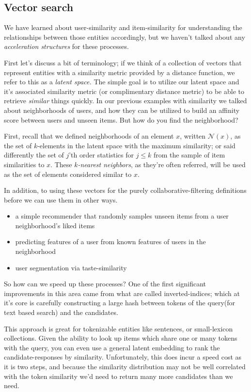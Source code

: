 \subsection{Vector search}

We have learned about user-similarity and item-similarity for understanding the relationships between those entities accordingly, but we haven't talked about any \emph{acceleration structures} for these processes. 

First let's discuss a bit of terminology; if we think of a collection of vectors that represent entities with a similarity metric provided by a distance function, we refer to this as a \emph{latent space.} The simple goal is to utilize our latent space and it's associated similarity metric (or complimentary distance metric) to be able to retrieve \emph{similar} things quickly. In our previous examples with similarity we talked about neighborhoods of users, and how they can be utilized to build an affinity score between users and unseen items. But how do you find the neighborhood?

First, recall that we defined neighborhoods of an element $x$, written $\mathcal{N}(x)$, as the set of $k$-elements in the latent space with the maximum similarity; or said differently the set of $j$'th order statistics for $j\leq k$ from the sample of item similarities to $x$. These \emph{$k$-nearest neighbors}, as they're often referred, will be used as the set of elements considered similar to $x$.

In addition, to using these vectors for the purely collaborative-filtering definitions before we can use them in other ways. 

\begin{itemize}
\item a simple recommender that randomly samples unseen items from a user neighborhood's liked items
\item predicting features of a user from known features of users in the neighborhood
\item user segmentation via taste-similarity
\end{itemize}

So how can we speed up these processes? One of the first significant improvements in this area came from what are called inverted-indices; which at it's core is carefully constructing a large hash between tokens of the query(for text based search) and the candidates. 

This approach is great for tokenizable entities like sentences, or small-lexicon collections. Given the ability to look up items which share one or many tokens with the query, you can even use a general latent embedding to rank the candidate-responses by similarity. Unfortunately, this does incur a speed cost as it is two steps, and because the similarity distribution may not be well correlated with the token similarity we'd need to return many more candidates than we need.  

